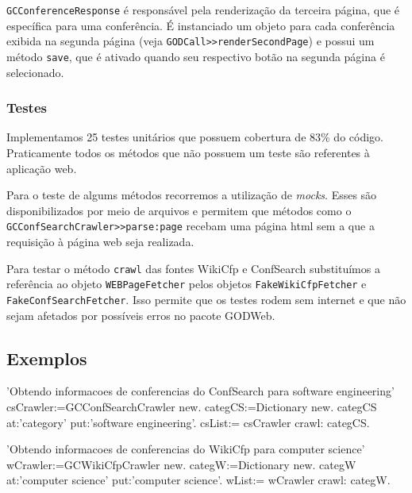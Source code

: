 \texttt{GCConferenceResponse} é responsável pela renderização da terceira página, que é específica para uma conferência. É instanciado um objeto para cada conferência exibida na segunda página (veja \texttt{GODCall>>renderSecondPage}) e possui um método \texttt{save}, que é ativado quando seu respectivo botão na segunda página é selecionado.

\subsubsection{Testes}%
Implementamos 25 testes unitários que possuem cobertura de 83\% do código. Praticamente todos os métodos que não possuem um teste são referentes à aplicação web.

Para o teste de algums métodos recorremos a utilização de \textit{mocks}. Esses são disponibilizados por meio de arquivos e permitem que métodos como o \texttt{GCConfSearchCrawler>>parse:page} recebam uma página html sem a que a requisição à página 
web seja realizada.

Para testar o método \texttt{crawl} das fontes WikiCfp e ConfSearch substituímos a referência ao objeto \texttt{WEBPageFetcher} pelos objetos \texttt{FakeWikiCfpFetcher} e \texttt{FakeConfSearchFetcher}. Isso permite que os testes rodem sem internet e que não sejam afetados por possíveis erros no pacote GODWeb.

\subsection{Exemplos}
\begin{godCode}

'Obtendo informacoes de conferencias do ConfSearch para software engineering'
csCrawler:=GCConfSearchCrawler new.
categCS:=Dictionary new.
categCS at:'category' put:'software engineering'.
csList:= csCrawler crawl: categCS.

'Obtendo informacoes de conferencias do WikiCfp para computer science'
wCrawler:=GCWikiCfpCrawler new.
categW:=Dictionary new.
categW at:'computer science' put:'computer science'.
wList:= wCrawler crawl: categW.

\end{godCode}

